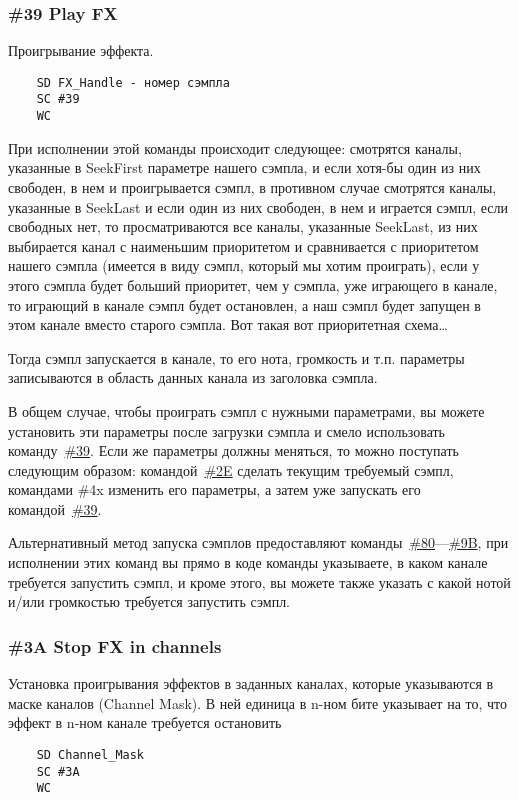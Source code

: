 \documentclass[a4paper,11pt]{article}
\begin{document}
\subsubsection{\#39 Play FX\label{cmd:39}}
Проигрывание эффекта.
\begin{verbatim}
    SD FX_Handle - номер сэмпла
    SC #39
    WC
\end{verbatim}

При исполнении этой команды происходит следующее: смотрятся каналы, указанные в SeekFirst параметре нашего сэмпла,
и если хотя-бы один из них свободен,  в нем и проигрывается сэмпл, в противном случае смотрятся  каналы,
указанные в SeekLast и если один из них свободен, в нем и играется сэмпл, если свободных нет,
то просматриваются все каналы, указанные SeekLast, из них выбирается канал с наименьшим приоритетом
и сравнивается с приоритетом нашего сэмпла (имеется в виду сэмпл, который мы хотим проиграть),
если  у этого сэмпла будет больший приоритет, чем у сэмпла, уже играющего в канале,
то играющий в канале сэмпл будет остановлен, а наш сэмпл будет запущен в этом канале вместо старого сэмпла.
Вот такая вот приоритетная схема\ldots

Тогда сэмпл запускается в канале, то его нота, громкость и т.п. параметры записываются в область данных канала
из заголовка сэмпла.

В общем случае, чтобы проиграть сэмпл с нужными параметрами, вы можете установить эти параметры
после загрузки сэмпла и смело использовать команду~\hyperref[cmd:39]{\#39}.
Если же параметры должны меняться, то можно поступать следующим образом:
командой~\hyperref[cmd:2E]{\#2E} сделать текущим требуемый сэмпл, командами  \#4x  изменить его параметры,
а затем уже запускать его командой~\hyperref[cmd:39]{\#39}.

Альтернативный метод запуска сэмплов предоставляют команды~\hyperref[cmd:80]{\#80}---\hyperref[cmd:9B]{\#9B},
при исполнении этих команд вы прямо в коде команды указываете, в каком канале требуется запустить сэмпл,
и кроме этого, вы можете также указать с какой нотой и/или громкостью требуется запустить сэмпл.

\subsubsection{\#3A Stop FX in channels}
Установка проигрывания эффектов в заданных каналах, которые указываются в маске каналов (Channel Mask). В ней единица в n-ном бите указывает на то, что эффект в n-ном канале требуется остановить
\begin{verbatim}
    SD Channel_Mask
    SC #3A
    WC
\end{verbatim}
\end{document}
